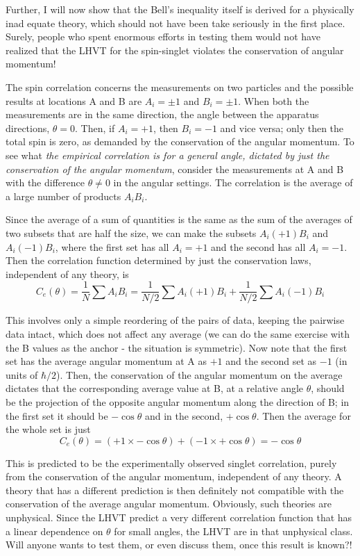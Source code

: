 Further, I will now show that the Bell's inequality itself is derived for a physically inad equate theory, which should not have been take seriously in the first place. Surely, people who spent enormous efforts in testing them would not have realized that the LHVT for the
spin-singlet violates the conservation of angular momentum!

The spin correlation concerns the measurements on two particles and the possible results
at locations A and B are $A_i = \pm 1$ and $B_i = \pm 1$. When both the measurements are in the
same direction, the angle between the apparatus directions, $\theta = 0$. Then, if $A_i = +1$, then
$B_i = -1$ and vice versa; only then the total spin is zero, as demanded by the conservation
of the angular momentum. To see what \textit{the empirical correlation is for a general angle,
dictated by just the conservation of the angular momentum}, consider the measurements at
A and B with the difference $\theta \neq 0$ in the angular settings. The correlation is the average of
a large number of products $A_i B_i$.

Since the average of a sum of quantities is the same as the sum of the averages of two
subsets that are half the size, we can make the subsets $A_i (+1)B_i$ and $A_i (-1)B_i$, where the
first set has all $A_i = +1$ and the second has all $A_i = -1$. Then the correlation function
determined by just the conservation laws, independent of any theory, is
$$
C_e (\theta) = \frac{1}{N} \sum A_i B_i = \frac{1}{N/2} \sum A_i (+1) B_i + \frac{1}{N/2} \sum A_i (-1) B_i
$$

This involves only a simple reordering of the pairs of data, keeping the pairwise data intact, which does not affect any average (we can do the same exercise with the B values as the anchor - the situation is symmetric). Now note that the first set has the average angular
momentum at A as $+1$ and the second set as $-1$ (in units of $\hbar/2$). Then, the conservation
of the angular momentum on the average dictates that the corresponding average value at
B, at a relative angle $\theta$, should be the projection of the opposite angular momentum along
the direction of B; in the first set it should be $- \cos \theta$ and in the second, $+ \cos \theta$. Then the
average for the whole set is just
\begin{equation*}
C_e  (\theta) = (+1 \times -\cos \theta) + (-1 \times + \cos \theta )  = - \cos \theta \tag{44}\label{c14-eq44}
\end{equation*}

This is predicted to be the experimentally observed singlet correlation, purely from the
conservation of the angular momentum, independent of any theory. A theory that has a
different prediction is then definitely not compatible with the conservation of the average
angular momentum. Obviously, such theories are unphysical. Since the LHVT predict a
very different correlation function that has a linear dependence on $\theta$ for small angles, the
LHVT are in that unphysical class. Will anyone wants to test them, or even discuss them,
once this result is known?!

